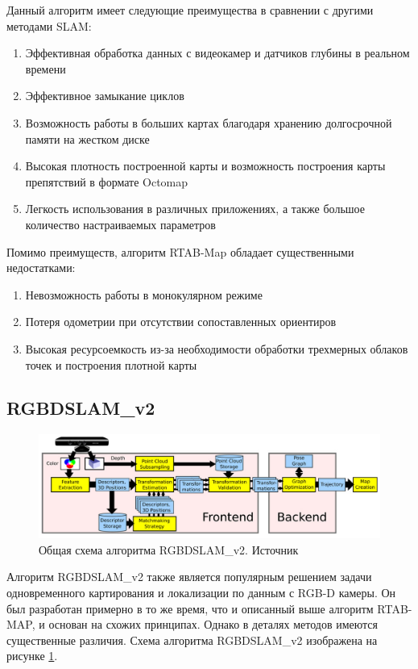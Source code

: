 \documentclass{mipt-thesis-ms}
\begin{document}
	Данный алгоритм имеет следующие преимущества в сравнении с другими методами SLAM:
	\begin{enumerate}
		\item {Эффективная обработка данных с видеокамер и датчиков глубины в реальном времени}
		\item {Эффективное замыкание циклов}
		\item {Возможность работы в больших картах благодаря хранению долгосрочной памяти на жестком диске}
		\item {Высокая плотность построенной карты и возможность построения карты препятствий в формате Octomap}
		\item {Легкость использования в различных приложениях, а также большое количество настраиваемых параметров}
	\end{enumerate}
	Помимо преимуществ, алгоритм RTAB-Map обладает существенными недостатками:
	\begin{enumerate}
		\item {Невозможность работы в монокулярном режиме}
		\item {Потеря одометрии при отсутствии сопоставленных ориентиров}
		\item {Высокая ресурсоемкость из-за необходимости обработки трехмерных облаков точек и построения плотной карты}
	\end{enumerate}
	
	\subsection{RGBDSLAM\_v2}
	
	\begin{figure}
		\includegraphics[width=1.0\textwidth]{img/rgbdslam_scheme.png}
		\caption{Общая схема алгоритма RGBDSLAM\_v2. Источник \cite{endres20133}}
		\label{figure_rgbdslam}
	\end{figure}
	
	Алгоритм RGBDSLAM\_v2 \cite{endres20133} также является популярным решением задачи одновременного картирования и локализации по данным с RGB-D камеры. Он был разработан примерно в то же время, что и описанный выше алгоритм RTAB-MAP, и основан на схожих принципах. Однако в деталях методов имеются существенные различия. Схема алгоритма RGBDSLAM\_v2 изображена на рисунке \ref{figure_rgbdslam}.
	
\end{document}
